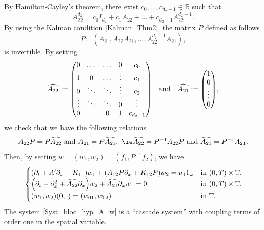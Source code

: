\documentclass[10pt]{amsart}
\theoremstyle{plain}
\theoremstyle{definition}
\theoremstyle{remark}
\newcommand{\set}{\mathbb}
\newcommand{\R}{} %
\renewcommand{\R}{\set{R}}
\newcommand{\T}{\set{T}}
\newcommand{\coloneqq}{\mathrel{\mathord{:}\mathord=}}
\let\originalleft\left
\let\originalright\right
\renewcommand{\left}{\mathopen{}\mathclose\bgroup\originalleft}
\renewcommand{\right}{\aftergroup\egroup\originalright}
\begin{document}
By Hamilton-Cayley's theorem, there exist $c_0, \dots, c_{d_2-1} \in \R$ such that
\[
A_{22}^{d_2} = c_0 I_{d_2} + c_1 A_{22} + \dots + c_{d_2-1} A_{22}^{d_2-1}.
\]
By using the Kalman condition \eqref{Kalman_Thm2}, the matrix $P$ defined as follows
\[
P \coloneqq (A_{21}, A_{22} A_{21}, \dots, A_{22}^{d_2-1} A_{21}),
\]
is invertible. By setting
\begin{equation}
\label{eq:cascade}\arraycolsep4.5pt
\widehat{A_{22}} \coloneqq \begin{pmatrix} 0 & \dots & \dots & 0 & c_0\\
1 & 0 &\dots & \vdots & c_1\\
0 & \ddots & \ddots & \vdots & c_2\\
\vdots & \ddots & \ddots & 0 & \vdots\\
0 & \dots &0 & 1 & c_{d_2-1}
\end{pmatrix}\quad \text{and}\quad \widehat{A_{21}} \coloneqq \begin{pmatrix} 1\\0\\ \vdots\\ 0 \end{pmatrix},
\end{equation}
we check that we have the following relations
\[
A_{22}P = P \widehat{A_{22}}\ \text{and}\ A_{21} = P \widehat{A_{21}},\ \text{\ie} \widehat{A_{22}} = P^{-1} A_{22} P\ \text{and}\ \widehat{A_{21}} = P^{-1} A_{21}.
\]
Then, by setting $w =(w_1,w_2) = (f_1,P^{-1}f_2)$, we have
\begin{equation} \label{Syst_bloc_hyp_A_w}
\begin{cases}
\left(\partial_t +A'\partial_x+K_{11}\right)w_1+\left(A_{12}P\partial_x+K_{12}P\right)w_2= u_1 1_\omega
&\text{in}\ (0,T)\times \T,\!\\
\left(\partial_t - \partial_x^2+\widehat{A_{22}}\partial_x\right)w_2 + \widehat{A_{21}}\partial_x w_1 = 0 &\text{in}\ (0,T)\times \T,\!\\
(w_1,w_2)(0,\cdot)=(w_{01},w_{02}) & \text{in}\ \T.
\end{cases}
\end{equation}
The system \eqref{Syst_bloc_hyp_A_w} is a “cascade system” with coupling terms of order one in the spatial variable.
\end{document}
